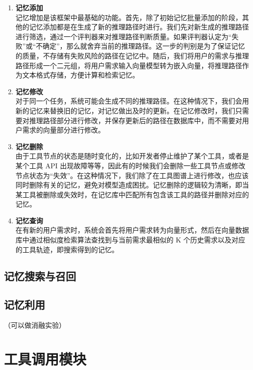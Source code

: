 \begin{enumerate}
    \item \textbf{记忆添加} \\
    记忆增加是该框架中最基础的功能。首先，除了初始记忆批量添加的阶段，其他的记忆添加都是在生成了新的推理路径时进行。我们先对新生成的推理路径进行筛选，通过一个评判器来对推理路径判断质量。如果评判器认定为“失败”或“不确定”，那么就舍弃当前的推理路径。这一步的判别是为了保证记忆的质量，不存储有失败风险的路径在记忆中。随后，我们将用户的需求与推理路径形成一个二元组，将用户需求输入向量模型转为嵌入向量，将推理路径作为文本格式存储，方便计算和检索记忆。

    \item \textbf{记忆修改} \\
    对于同一个任务，系统可能会生成不同的推理路径。在这种情况下，我们会用新的记忆来替换旧的记忆，对记忆做出及时的更新。在记忆修改时，我们只需要对推理路径部分进行修改，并保存更新后的路径在数据库中，而不需要对用户需求的向量部分进行修改。

    \item \textbf{记忆删除} \\
    由于工具节点的状态是随时变化的，比如开发者停止维护了某个工具，或者是某个工具 API 出现故障等等，因此有的时候我们会删除一些工具节点或修改节点状态为“失效”。在这种情况下，我们除了在工具图谱上进行修改，也应该同时删除有关的记忆，避免对模型造成困扰。记忆删除的逻辑较为清晰，即当某工具被删除或失效时，在记忆库中匹配所有包含该工具的路径并删除对应的记忆。

    \item \textbf{记忆查询} \\
    在有新的用户需求时，系统会首先将用户需求转为向量形式，然后在向量数据库中通过相似度检索算法查找到与当前需求最相似的 K 个历史需求以及对应的工具轨迹，即搜索得到的记忆。
\end{enumerate}

\subsection{记忆搜索与召回}
\subsection{记忆利用}
（可以做消融实验）

\section{工具调用模块}
\label{sec:real_tool_simulation}

